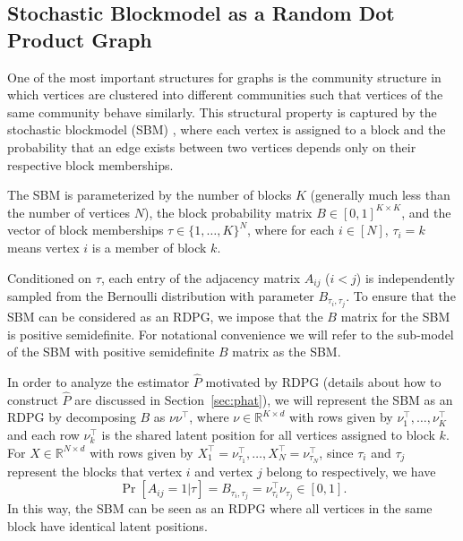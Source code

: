 \documentclass[10pt,letterpaper]{article}
\renewcommand{\Re}{\mathbb{R}}
\renewcommand{\hat}{\widehat}
\begin{document}
\subsection{Stochastic Blockmodel as a Random Dot Product Graph}
\label{section:sbm_rdpg}
One of the most important structures for graphs is the community structure in which vertices are clustered into different communities such that vertices of the same community behave similarly. This structural property is captured by the stochastic blockmodel (SBM) \citep{holland1983stochastic}, where each vertex is assigned to a block and the probability that an edge exists between two vertices depends only on their respective block memberships.



The SBM is parameterized by the number of blocks $K$ (generally much less than the number of vertices $N$), the block probability matrix $B \in [0,1]^{K \times K}$, and the vector of block memberships
$\tau\in\{1,\dotsc,K\}^N$, where for each $i \in [N]$, $\tau_i = k$ means vertex $i$ is a member of block $k$.

Conditioned on $\tau$, each entry of the adjacency matrix $A_{ij}$ ($i < j$) is independently sampled from the Bernoulli distribution with parameter $B_{\tau_i,\tau_j}$.
To ensure that the SBM can be considered as an RDPG, we impose that the $B$ matrix for the SBM is positive semidefinite. 
For notational convenience we will refer to the sub-model of the SBM with positive semidefinite $B$ matrix as the SBM.

In order to analyze the estimator $\hat{P}$ motivated by RDPG (details about how to construct $\hat{P}$ are discussed in Section~\ref{sec:phat}), we will represent the SBM as an RDPG by
decomposing $B$ as $\nu \nu^{\top}$, where $\nu \in \Re^{K \times d}$ with rows given by $\nu_1^{\top}, \dotsc, \nu_K^{\top}$ and each row $\nu_k^{\top}$ is the shared latent position for all vertices assigned to block $k$. 
For $X \in \Re^{N \times d}$ with rows given by $X_1^{\top} = \nu_{\tau_1}^{\top}, \dotsc, X_N^{\top} = \nu_{\tau_N}^{\top}$, since $\tau_i$ and $\tau_j$ represent the blocks that vertex $i$ and vertex $j$ belong to respectively, we have
\[
    \Pr[A_{ij} = 1|\tau] = B_{\tau_i, \tau_j} = \nu_{\tau_i}^{\top} \nu_{\tau_j}^{\phantom{\top}} \in [0, 1].
\]
In this way, the SBM can be seen as an RDPG where all vertices in the same block have identical latent positions.
\end{document}
